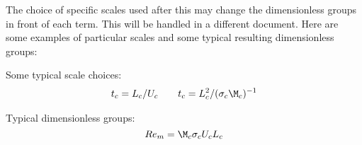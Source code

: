 \documentclass[11pt]{article}
\begin{document}
The choice of specific scales used after this may change the dimensionless groups in front of each term. This will be handled in a different document. Here are some examples of particular scales and some typical resulting dimensionless groups:

Some typical scale choices:
\begin{equation}\begin{aligned}
	t_c = L_c/ U_c \qquad
	t_c = L_c^2/ (\sigma_c \M_c)^{-1}
\end{aligned}\end{equation}

Typical dimensionless groups:
\begin{equation}
	Re_m = \M_c \sigma_c U_c L_c
\end{equation}
\end{document}
